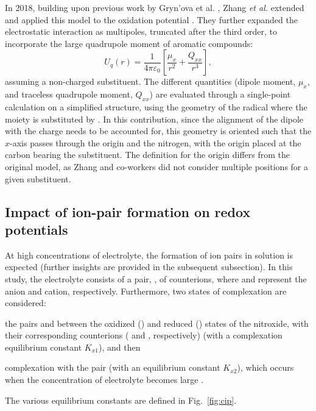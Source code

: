 \documentclass[review]{elsarticle}
\begin{document}
In 2018, building upon previous work by Gryn'ova et al. \cite{grynovaOriginScopeLongRange2013,grynovaSwitchingRadicalStability2013}, Zhang \textit{et al.} extended and applied this model to the oxidation potential \cite{zhangEffectHeteroatomFunctionality2018}. They further expanded the electrostatic interaction as multipoles, truncated after the third order, to incorporate the large quadrupole moment of aromatic compounds:
\begin{equation}
	U_q(r) =\frac{1}{4\pi\varepsilon_0} \left[\frac{\mu_x}{r^2} + \frac{Q_{xx}}{r^3}\right], \label{eq:Er}
\end{equation}
assuming a non-charged substituent. The different quantities (dipole moment, $\mu_x$, and traceless quadrupole moment, $Q_{xx}$) are evaluated through a single-point calculation on a simplified structure, using the geometry of the radical where the  moiety is substituted by . In this contribution, since the alignment of the dipole with the charge needs to be accounted for, this geometry is oriented such that the $x$-axis passes through the origin and the nitrogen, with the origin placed at the carbon bearing the substituent. The definition for the origin differs from the original model, as Zhang and co-workers did not consider multiple positions for a given substituent.


\subsection{Impact of ion-pair formation on redox potentials}

At high concentrations of electrolyte, the formation of ion pairs in solution is expected (further insights are provided in the subsequent subsection). In this study, the electrolyte consists of a pair, , of counterions, where  and  represent the anion and cation, respectively. Furthermore, two states of complexation are considered: \begin{inparaenum}[(i)]
	\item the pairs  and  between the oxidized () and reduced () states of the nitroxide, with their corresponding counterions ( and , respectively) (with a complexation equilibrium constant $K_{x1}$), and then
	\item complexation with the  pair (with an equilibrium constant $K_{x2}$), which occurs when the concentration of electrolyte becomes large \cite{wylieImprovedPerformanceAllOrganic2019a}.
\end{inparaenum}
The various equilibrium constants are defined in Fig.~\ref{fig:cip}.
\end{document}
